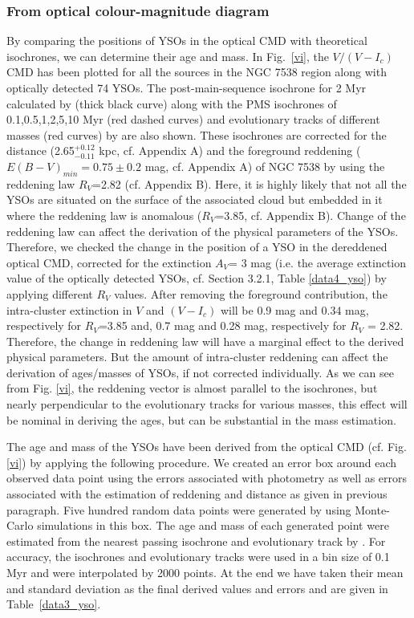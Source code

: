 \documentclass[a4paper,fleqn,usenatbib,useAMS]{mnras}
\begin{document}
\subsubsection{From optical colour-magnitude diagram}

By comparing the positions of YSOs in the optical CMD with theoretical isochrones, 
we can determine their age and mass.
In Fig.~\ref{vi}, the $V /(V - I_c)$ CMD has been plotted for all the 
sources in the NGC 7538 region along with optically detected 74 YSOs.
The post-main-sequence isochrone for 2 Myr calculated by \citet{2008AA...482..883M} (thick black curve) along with the PMS isochrones
of 0.1,0.5,1,2,5,10 Myr (red dashed curves) and evolutionary tracks of different masses (red curves)  by \citet{2000AA...358..593S} are also shown.
These isochrones are corrected for the distance (2.65$^{+0.12}_{ -0.11}$ kpc, cf. Appendix A) 
and the foreground reddening
($E(B - V )_{min} = 0.75\pm0.2$ mag, cf. Appendix A) of NGC 7538 by using the reddening law $R_V$=2.82 (cf. Appendix B).
Here, it is highly likely that not all the YSOs are situated  on the surface of the associated cloud 
but embedded in it where the reddening law is anomalous ($R_V$=3.85, cf. Appendix B).
Change of the reddening law can affect the derivation of the physical parameters of the YSOs.
Therefore, we checked the change in the position of a YSO in the dereddened optical CMD, 
corrected for the extinction $A_V$= 3 mag (i.e. the average extinction value
of the optically detected YSOs, cf. Section 3.2.1, Table \ref{data4_yso}) by applying
different $R_V$ values.
After removing the foreground contribution,
the  intra-cluster extinction in $V$ and $(V-I_c)$  will be 0.9 mag and 0.34 mag, respectively for $R_V$=3.85
and,  0.7 mag and 0.28 mag, respectively for $R_V$ = 2.82.
Therefore, the change in reddening law will have a marginal effect to the derived physical parameters. 
But the amount of intra-cluster reddening can affect the derivation of ages/masses of YSOs, if not corrected individually. 
As we can see from Fig. \ref{vi}, the reddening vector is almost parallel to the isochrones, 
but nearly perpendicular to the evolutionary tracks for various masses, 
this effect will be nominal in deriving the ages, but can be substantial in the mass estimation. 

The age and mass of the YSOs have been derived from the optical CMD (cf. Fig. \ref{vi}) by applying the following procedure.
We created an error box around each observed data point using the errors associated with photometry 
as well as errors associated with the estimation of reddening and distance as given in previous paragraph. 
Five hundred random data points were generated by using Monte-Carlo simulations in this box.
The age and mass of each generated point were estimated from the nearest passing isochrone and evolutionary track by \citet{2000AA...358..593S}.
For accuracy, the isochrones and  evolutionary tracks  were used in a bin size of 0.1 Myr and were interpolated by 2000 points.
At the end we have taken their mean and standard deviation as the final derived values and errors and 
are given in  Table~\ref{data3_yso}. 
\end{document}
